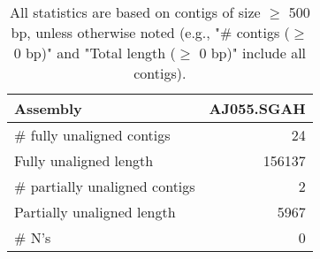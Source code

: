 \documentclass[12pt,a4paper]{article}
\begin{document}
\begin{table}[ht]
\begin{center}
\caption{All statistics are based on contigs of size $\geq$ 500 bp, unless otherwise noted (e.g., "\# contigs ($\geq$ 0 bp)" and "Total length ($\geq$ 0 bp)" include all contigs).}
\begin{tabular}{|l*{1}{|r}|}
\hline
Assembly & AJ055.SGAH \\ \hline
\# fully unaligned contigs & 24 \\ \hline
Fully unaligned length & 156137 \\ \hline
\# partially unaligned contigs & 2 \\ \hline
Partially unaligned length & 5967 \\ \hline
\# N's & 0 \\ \hline
\end{tabular}
\end{center}
\end{table}
\end{document}
